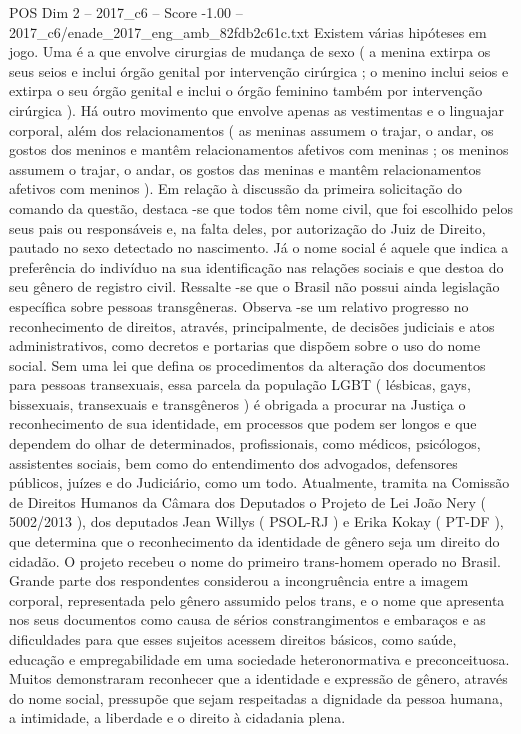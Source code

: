 \begin{textsample}{POS Dim 2 – 2017\_c6 – Score -1.00 – 2017\_c6/enade\_2017\_eng\_amb\_82fdb2c61c.txt}
Existem várias hipóteses em jogo.
Uma é a que envolve cirurgias de mudança de sexo ( a menina extirpa os seus seios e inclui órgão genital por intervenção cirúrgica ; o menino inclui seios e extirpa o seu órgão genital e inclui o órgão feminino também por intervenção cirúrgica ).
Há outro movimento que envolve apenas as vestimentas e o linguajar corporal, além dos relacionamentos ( as meninas assumem o trajar, o andar, os gostos dos meninos e mantêm relacionamentos afetivos com meninas ; os meninos assumem o trajar, o andar, os gostos das meninas e mantêm relacionamentos afetivos com meninos ).
Em relação à discussão da primeira solicitação do comando da questão, destaca -se que todos têm nome civil, que foi escolhido pelos seus pais ou responsáveis e, na falta deles, por autorização do Juiz de Direito, pautado no sexo detectado no nascimento.
Já o nome social é aquele que indica a preferência do indivíduo na sua identificação nas relações sociais e que destoa do seu gênero de registro civil.
Ressalte -se que o Brasil não possui ainda legislação específica sobre pessoas transgêneras.
Observa -se um relativo progresso no reconhecimento de direitos, através, principalmente, de decisões judiciais e atos administrativos, como decretos e portarias que dispõem sobre o uso do nome social.
Sem uma lei que defina os procedimentos da alteração dos documentos para pessoas transexuais, essa parcela da população LGBT ( lésbicas, gays, bissexuais, transexuais e transgêneros ) é obrigada a procurar na Justiça o reconhecimento de sua identidade, em processos que podem ser longos e que dependem do olhar de determinados, profissionais, como médicos, psicólogos, assistentes sociais, bem como do entendimento dos advogados, defensores públicos, juízes e do Judiciário, como um todo.
Atualmente, tramita na Comissão de Direitos Humanos da Câmara dos Deputados o Projeto de Lei João Nery ( 5002/2013 ), dos deputados Jean Willys ( PSOL-RJ ) e Erika Kokay ( PT-DF ), que determina que o reconhecimento da identidade de gênero seja um direito do cidadão.
O projeto recebeu o nome do primeiro trans-homem operado no Brasil.
Grande parte dos respondentes considerou a incongruência entre a imagem corporal, representada pelo gênero assumido pelos trans, e o nome que apresenta nos seus documentos como causa de sérios constrangimentos e embaraços e as dificuldades para que esses sujeitos acessem direitos básicos, como saúde, educação e empregabilidade em uma sociedade heteronormativa e preconceituosa.
Muitos demonstraram reconhecer que a identidade e expressão de gênero, através do nome social, pressupõe que sejam respeitadas a dignidade da pessoa humana, a intimidade, a liberdade e o direito à cidadania plena.

\end{textsample}
